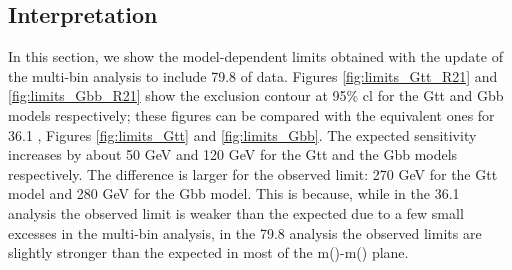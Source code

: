\FloatBarrier

\subsection{Interpretation}

In this section, we show the model-dependent limits obtained with the update of the multi-bin analysis to include 79.8 \ifb of data. 
Figures \ref{fig:limits_Gtt_R21} and \ref{fig:limits_Gbb_R21} show the exclusion contour at 95\% \gls{cl} for the Gtt and Gbb 
models respectively; these figures can be compared with the equivalent ones for 36.1 \ifb, Figures \ref{fig:limits_Gtt} and 
\ref{fig:limits_Gbb}. 
The expected sensitivity increases by about 50 GeV and 120 GeV for the Gtt and the Gbb models respectively. 
The difference is larger for the observed limit: 270 GeV for the Gtt model and 280 GeV for the Gbb model. 
This is because, while in the 36.1 \ifb analysis the observed limit is weaker than the expected due to 
a few small excesses in the multi-bin analysis, in the 79.8 \ifb 
analysis the observed limits are slightly stronger than the expected in most of the 
m(\gluino)-m(\ninoone) plane. 



